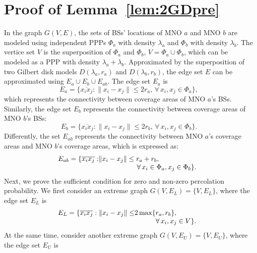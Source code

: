 \documentclass[final]{IEEEtran}
\begin{document}
\section{Proof of Lemma~\ref{lem:2GDpre}}\label{app:2GDpre}
\indent In the graph $G(V,E)$, the sets of BSs' locations of MNO $a$ and MNO $b$ are modeled using independent PPPs $\Phi_a$ with density $\lambda_a$ and $\Phi_b$ with density $\lambda_b$. The vertice set $V$ is the superposition of $\Phi_a$ and $\Phi_b$, \ie $V=\Phi_a \cup \Phi_b$, which can be modeled as a PPP with density $\lambda_a+\lambda_b$. Approximated by the superposition of two Gilbert disk models $D(\lambda_a,r_{a})$ and $D(\lambda_b,r_{b})$, the edge set $E$ can be approximated using $E_a\cup E_b \cup E_{ab}$. The edge set $E_a$ is
\begin{equation}
    E_a=\{\overline{x_{i}x_{j}}:\|x_{i}-x_{j}\|\leq 2r_{a},\,\forall\,x_{i},x_{j}\in\Phi_a\},
\end{equation}
which represents the connectivity between coverage areas of MNO $a$'s BSs. Similarly, the edge set $E_b$ represents the connectivity between coverage areas of MNO $b$'s BSs:
\begin{equation}
    E_b=\{\overline{x_{i}x_{j}}:\|x_{i}-x_{j}\|\leq 2r_{b},\,\forall\,x_{i},x_{j}\in\Phi_b\}.
\end{equation}
\indent Differently, the set $E_{ab}$ represents the connectivity between MNO $a$'s coverage areas and MNO $b$'s coverage areas, which is expressed as:
\begin{equation}
\begin{array}{@{}r@{}l}
    E_{ab}=\{\overline{x_{i}x_{j}}:&\|x_{i}-x_{j}\|\leq r_{a}+r_{b},\\ &\;\;\;\;\;\;\;\;\;\;\;\;\;\;\;\;\;\;\;\;\forall\,x_{i}\in\Phi_a,x_{j}\in\Phi_b\}.  
\end{array}
\end{equation}
\indent Next, we prove the sufficient condition for zero and non-zero percolation probability. We first consider an extreme graph $G(V,E_L)=\{V,E_L\}$, where the edge set $E_L$ is
\begin{equation}
\begin{array}{@{}r@{}l}
    E_L=\{\overline{x_{i}x_{j}}:\|x_{i}-x_{j}\|\leq & 2\max\{r_{a},r_{b}\},\\
    &\;\;\;\;\;\;\;\;\;\;\;\forall\,x_{i},x_{j}\in V\}.
\end{array}
\end{equation}
\indent At the same time, consider another extreme graph $G(V,E_U)=\{V,E_U\}$, where the edge set $E_U$ is
\end{document}
